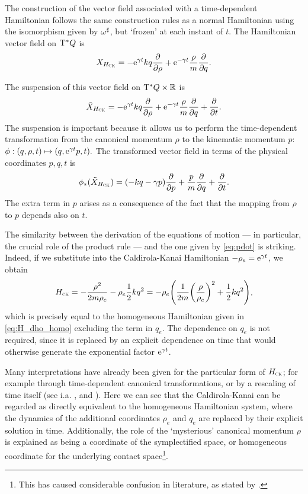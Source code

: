 The construction of the vector field associated with a time-dependent Hamiltonian follows the same construction rules as a normal Hamiltonian using the isomorphism given by \(\omega^\sharp\), but `frozen' at each instant of \(t\). The Hamiltonian vector field on \(\mathrm{T}^*Q\) is
\begin{equation}
     X_{H_\text{\tiny{\textsc{CK}}}} = -\mathrm{e}^{\gamma t}kq\pdv{}{\ensuremath{\rho}} + \mathrm{e}^{-\gamma t}\frac{\rho}{m}\pdv{}{q}.
\end{equation}

The suspension of this vector field on \(\mathrm{T}^*Q\times \mathbb{R}\) is
\begin{equation}
     \tilde{X}_{H_\text{\tiny{\textsc{CK}}}} = -\mathrm{e}^{\gamma t}kq\pdv{}{\ensuremath{\rho}} + \mathrm{e}^{-\gamma t}\frac{\rho}{m}\pdv{}{q} + \pdv{}{t}.
\end{equation}
The suspension is important because it allows us to perform the time-dependent transformation from the canonical momentum \(\rho\) to the kinematic momentum \(p\):
\(\phi: (q, \rho, t) \mapsto (q, \mathrm{e}^{\gamma t}p, t).\)
The transformed vector field in terms of the physical coordinates \(p, q, t\) is
\begin{equation}
     \phi_*(\tilde{X}_{H_\text{\tiny{\textsc{CK}}}}) = \qty(-kq - \gamma p)\pdv{}{p} + \frac{p}{m}\pdv{}{q} + \pdv{}{t}.
\end{equation}
The extra term in \(p\) arises as a consequence of the fact that the mapping from \(\rho\) to \(p\) depends also on \(t\). 

The similarity between the derivation of the equations of motion --- in particular, the crucial role of the product rule --- and the one given by \cref{eq:pdot} is striking. Indeed, if we substitute into the Caldirola-Kanai Hamiltonian \(-\rho_e = \mathrm{e}^{\gamma t}\), we obtain
\begin{equation}
     H_\text{\tiny{\textsc{CK}}} = -\frac{\rho^2}{2m\rho_e} - \rho_e \frac{1}{2}kq^2 = -\rho_e \qty (\frac{1}{2m}\qty(\frac{\rho}{\rho_e})^2 + \frac{1}{2}kq^2),
\end{equation}
which is precisely equal to the homogeneous Hamiltonian given in \cref{eq:H_dho_homo} excluding the term in \(q_e\). The dependence on \(q_e\) is not required, since it is replaced by an explicit dependence on time that would otherwise generate the exponential factor \(\mathrm{e}^{\gamma t}\). 

Many interpretations have already been given for the particular form of \(H_\text{\tiny{\textsc{CK}}}\); for example through time-dependent canonical transformations, or by a rescaling of time itself (see i.a. \citet{Tokieda2021}, \citet{Caldirola1941} and \citet{Bravetti2017}). Here we can see that the Caldirola-Kanai can be regarded as  directly equivalent to the homogeneous Hamiltonian system, where the dynamics of the additional coordinates \(\rho_e\) and \(q_e\) are replaced by their explicit solution in time. Additionally, the role of the `mysterious' canonical momentum \(\rho\) is explained as being a coordinate of the symplectified space, or homogeneous coordinate for the underlying contact space\footnote{This has caused considerable confusion in literature, as stated by \citet{Schuch1997}.}.


